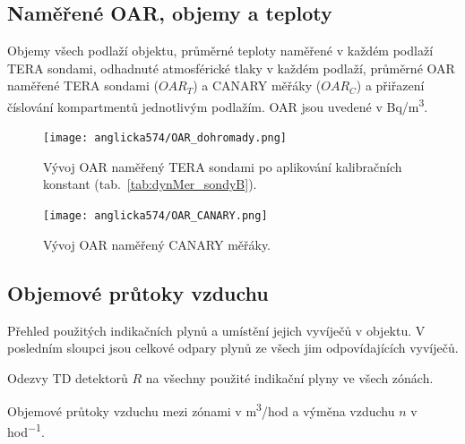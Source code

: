 \subsection{Naměřené OAR, objemy a teploty}

\begin{table}[H]
    \centering
    \caption{Objemy všech podlaží objektu, průměrné teploty naměřené v každém podlaží TERA sondami, odhadnuté atmosférické tlaky v každém podlaží, průměrné OAR naměřené TERA sondami ($OAR_T$) a CANARY měřáky ($OAR_C$) a přiřazení číslování kompartmentů jednotlivým podlažím. OAR jsou uvedené v \si{Bq/m^3}.}
    \label{tab:anglicka574_objemy}
    
\end{table}
\begin{figure}[H]
    \centering
    \texttt{[image: anglicka574/OAR\_dohromady.png]}
    \caption{Vývoj OAR naměřený TERA sondami po aplikování kalibračních konstant (tab.~\ref{tab:dynMer_sondyB}).}
    \label{fig:anglicka574_OAR_dohromady}
\end{figure}
\begin{figure}[H]
    \centering
    \texttt{[image: anglicka574/OAR\_CANARY.png]}
    \caption{Vývoj OAR naměřený CANARY měřáky.}
    \label{fig:anglicka574_OAR_CANARY}
\end{figure}

\subsection{Objemové průtoky vzduchu}

\begin{table}[H]
    \centering
    \caption{Přehled použitých indikačních plynů a umístění jejich vyvíječů v objektu. V posledním sloupci jsou celkové odpary plynů ze všech jim odpovídajících vyvíječů.}
    \label{tab:anglicka574_indikacniPlyny}
    
\end{table}
\begin{table}[H]
    \centering
    \caption{Odezvy TD detektorů $R$ na všechny použité indikační plyny ve všech zónách.}
    \label{tab:anglicka574_odezvyTD}
    
\end{table}

\begin{table}[H]
    \centering
    \caption{Objemové průtoky vzduchu mezi zónami v \si{m^3/hod} a výměna vzduchu $n$ v \si{hod^{-1}}.}
    \label{tab:anglicka574_prutoky}
    
\end{table}
